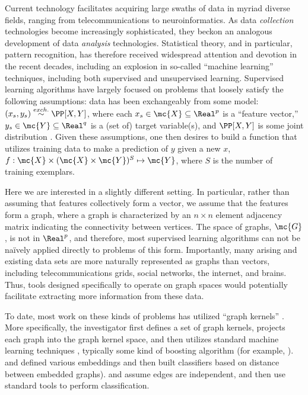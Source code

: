Current technology facilitates acquiring large swaths of data in myriad diverse fields, ranging from telecommunications to neuroinformatics. As  data \emph{collection} technologies become increasingly sophisticated,  they beckon an analogous development of data \emph{analysis} technologies.  Statistical theory, and in particular, pattern recognition, has therefore received widespread attention and devotion in the recent decades, including an explosion in so-called ``machine learning'' techniques, including both supervised and unsupervised learning.  Supervised learning algorithms have largely focused on problems that loosely satisfy the following assumptions: data has been exchangeably from some model: $(x_s,y_s) \overset{exch.}{\sim} \PP[X,Y]$, where each $x_s \in \mc{X} \subseteq \Real^p$ is a ``feature vector,'' $y_s \in \mc{Y} \subseteq\Real^q$ is a (set of) target variable(s), and $\PP[X,Y]$ is some joint distribution \cite{DGL96}.  Given these assumptions, one then desires to build a function that utilizes training data to make a prediction of $y$ given a new $x$, $f: \mc{X} \times (\mc{X} \times \mc{Y})^S \mapsto \mc{Y}$, where $S$ is the number of training exemplars.  

Here we are interested in a slightly different setting.  In particular, rather than assuming that features collectively form a vector, we assume that the features form a graph, where a graph is characterized by an $n \times n$ element adjacency matrix indicating the connectivity between vertices.  The space of graphs, $\mc{G}$, is not in $\Real^p$, and therefore, most supervised learning algorithms can not be na\"{i}vely applied directly to problems of this form.  Importantly, many arising and existing data sets are more naturally represented as graphs than vectors, including telecommunications grids, social networks, the internet, and brains.  Thus, tools designed specifically to operate on graph spaces would potentially facilitate extracting more information from these data.

To date, most work on these kinds of problems has utilized ``graph kernels'' \cite{Gartner03}.  More specifically, the investigator first defines a set of graph kernels, projects each graph into the graph kernel space, and then utilizes standard machine learning techniques \cite{HastieFriedman01}, typically some kind of boosting algorithm \cite{FreundSchapire95} (for example, \cite{KashimaInokuchi02, KashimaInokuchi03, KudoMatsumoto04}). \cite{BunkeRiesen08} and \cite{RiesenBunke09} defined various embeddings and then built classifiers based on distance between embedded graphs). \cite{FlachLachiche04} and \cite{TrentinIorio09} assume edges are independent, and then use standard tools to perform classification.  

